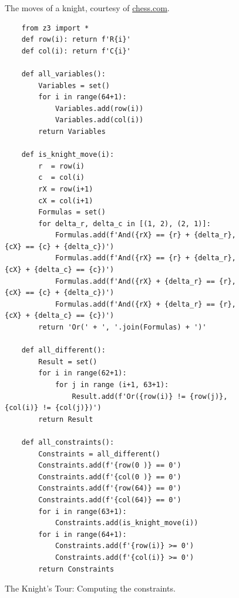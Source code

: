 \begin{figure}[!ht]
  \centering
  \caption{The moves of a knight, courtesy of \href{https://www.chess.com/}{chess.com}.}
  \label{fig:knight-moves.png}
\end{figure}

\begin{figure}[!ht]
\centering
\begin{verbatim}
    from z3 import *
    def row(i): return f'R{i}'
    def col(i): return f'C{i}'
    
    def all_variables():
        Variables = set()
        for i in range(64+1):
            Variables.add(row(i))
            Variables.add(col(i))
        return Variables
    
    def is_knight_move(i):
        r  = row(i)
        c  = col(i)
        rX = row(i+1)
        cX = col(i+1)
        Formulas = set()
        for delta_r, delta_c in [(1, 2), (2, 1)]:
            Formulas.add(f'And({rX} == {r} + {delta_r}, {cX} == {c} + {delta_c})')
            Formulas.add(f'And({rX} == {r} + {delta_r}, {cX} + {delta_c} == {c})')
            Formulas.add(f'And({rX} + {delta_r} == {r}, {cX} == {c} + {delta_c})')
            Formulas.add(f'And({rX} + {delta_r} == {r}, {cX} + {delta_c} == {c})') 
        return 'Or(' + ', '.join(Formulas) + ')'
    
    def all_different():
        Result = set()
        for i in range(62+1):
            for j in range (i+1, 63+1):
                Result.add(f'Or({row(i)} != {row(j)}, {col(i)} != {col(j)})')
        return Result    

    def all_constraints():
        Constraints = all_different()
        Constraints.add(f'{row(0 )} == 0')
        Constraints.add(f'{col(0 )} == 0')
        Constraints.add(f'{row(64)} == 0')
        Constraints.add(f'{col(64)} == 0')
        for i in range(63+1):
            Constraints.add(is_knight_move(i))
        for i in range(64+1):
            Constraints.add(f'{row(i)} >= 0')
            Constraints.add(f'{col(i)} >= 0')
        return Constraints
\end{verbatim}
\vspace*{-0.3cm}
\caption{The Knight's Tour: Computing the constraints.}
\label{fig:Knight's Tour with Z3.ipynb-1}
\end{figure}



